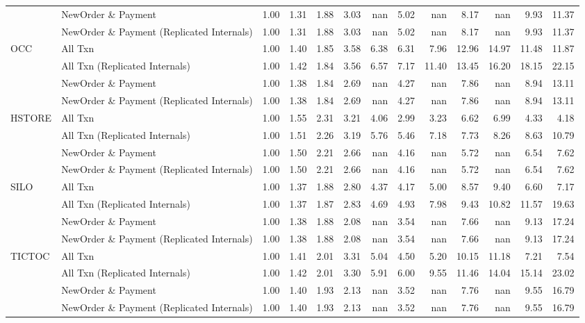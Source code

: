\begin{tabular}{llrrrrrrrrrrr}
       & NewOrder \& Payment &  1.00 &  1.31 &  1.88 &  3.03 &   nan &  5.02 &   nan &  8.17 &   nan &  9.93 & 11.37 \\
       & NewOrder \& Payment (Replicated Internals) &  1.00 &  1.31 &  1.88 &  3.03 &   nan &  5.02 &   nan &  8.17 &   nan &  9.93 & 11.37 \\
OCC & All Txn &  1.00 &  1.40 &  1.85 &  3.58 &  6.38 &  6.31 &  7.96 & 12.96 & 14.97 & 11.48 & 11.87 \\
       & All Txn (Replicated Internals) &  1.00 &  1.42 &  1.84 &  3.56 &  6.57 &  7.17 & 11.40 & 13.45 & 16.20 & 18.15 & 22.15 \\
       & NewOrder \& Payment &  1.00 &  1.38 &  1.84 &  2.69 &   nan &  4.27 &   nan &  7.86 &   nan &  8.94 & 13.11 \\
       & NewOrder \& Payment (Replicated Internals) &  1.00 &  1.38 &  1.84 &  2.69 &   nan &  4.27 &   nan &  7.86 &   nan &  8.94 & 13.11 \\
HSTORE & All Txn &  1.00 &  1.55 &  2.31 &  3.21 &  4.06 &  2.99 &  3.23 &  6.62 &  6.99 &  4.33 &  4.18 \\
       & All Txn (Replicated Internals) &  1.00 &  1.51 &  2.26 &  3.19 &  5.76 &  5.46 &  7.18 &  7.73 &  8.26 &  8.63 & 10.79 \\
       & NewOrder \& Payment &  1.00 &  1.50 &  2.21 &  2.66 &   nan &  4.16 &   nan &  5.72 &   nan &  6.54 &  7.62 \\
       & NewOrder \& Payment (Replicated Internals) &  1.00 &  1.50 &  2.21 &  2.66 &   nan &  4.16 &   nan &  5.72 &   nan &  6.54 &  7.62 \\
SILO & All Txn &  1.00 &  1.37 &  1.88 &  2.80 &  4.37 &  4.17 &  5.00 &  8.57 &  9.40 &  6.60 &  7.17 \\
       & All Txn (Replicated Internals) &  1.00 &  1.37 &  1.87 &  2.83 &  4.69 &  4.93 &  7.98 &  9.43 & 10.82 & 11.57 & 19.63 \\
       & NewOrder \& Payment &  1.00 &  1.38 &  1.88 &  2.08 &   nan &  3.54 &   nan &  7.66 &   nan &  9.13 & 17.24 \\
       & NewOrder \& Payment (Replicated Internals) &  1.00 &  1.38 &  1.88 &  2.08 &   nan &  3.54 &   nan &  7.66 &   nan &  9.13 & 17.24 \\
TICTOC & All Txn &  1.00 &  1.41 &  2.01 &  3.31 &  5.04 &  4.50 &  5.20 & 10.15 & 11.18 &  7.21 &  7.54 \\
       & All Txn (Replicated Internals) &  1.00 &  1.42 &  2.01 &  3.30 &  5.91 &  6.00 &  9.55 & 11.46 & 14.04 & 15.14 & 23.02 \\
       & NewOrder \& Payment &  1.00 &  1.40 &  1.93 &  2.13 &   nan &  3.52 &   nan &  7.76 &   nan &  9.55 & 16.79 \\
       & NewOrder \& Payment (Replicated Internals) &  1.00 &  1.40 &  1.93 &  2.13 &   nan &  3.52 &   nan &  7.76 &   nan &  9.55 & 16.79 \\
\bottomrule
\end{tabular}
